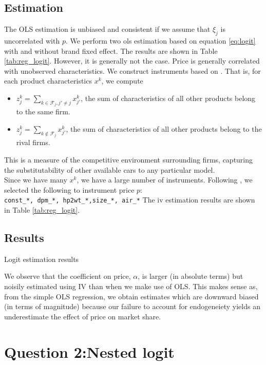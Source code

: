 \documentclass[12pt]{article}
\begin{document}
\subsection{Estimation}
The OLS estimation is unbiased and consistent if we assume that $\xi_j$ is
uncorrelated with $p$. We perform two ols estimation based on equation
\ref{eq:logit} with and without brand fixed effect. The results are shown in
Table \ref{tab:reg_logit}. However, it is generally not the case. Price is
generally correlated with unobserved characteristics. We construct instruments
based on \citet{berrylevinsohnpakes1995}. That is, for each product
characteristics $x^k$, we compute
\begin{itemize}
    \item $z^k_{j}=\sum_{k\in \mathcal{F}_j, j'\neq j}x^k_{j'}$, the sum of characteristics of all other products belong to the same firm.
    \item $z^k_{j}=\sum_{k\notin \mathcal{F}_j}x^k_{j'}$, the sum of characteristics of all other products belong to the rival firms.
\end{itemize}
This is a measure of the competitive environment surrounding firms, capturing the substitutability of other available cars to any particular model.\\
Since we have many $x^k$, we have a large number of instruments. Following \citep{berrylevinsohnpakes1995}, we selected the following to instrument price $p$:\\
\verb|const_*, dpm_*, hp2wt_*,size_*, air_*|
The iv estimation results are shown in Table \ref{tab:reg_logit}.
\subsection{Results}
\begin{table}[h!]\fontsize{10pt}{12pt}\selectfont
    \centering
    
    \caption{Logit estimation results}
    \label{tab:reg_logit}
\end{table}
We observe that the coefficient on price, $\alpha$, is larger (in absolute terms) but noisily estimated using IV than when we make use of OLS. This makes sense as, from the simple OLS regression, we obtain estimates which are downward biased (in terms of magnitude) because our failure to account for endogeneiety yields an underestimate the effect of price on market share.

\section{Question 2:Nested logit}
\end{document}
